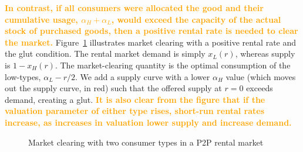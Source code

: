 \documentclass[11pt]{article}
\newcommand{\important}[1]{\textcolor{orange}{\textbf{#1}}}
\begin{document}
\important{In contrast, if all consumers were allocated the good and their cumulative usage, $\alpha_H + \alpha_L$, would exceed the capacity of the actual stock of purchased goods, then a positive rental rate is needed to clear the market.}
Figure~\ref{fig:market_clearing} illustrates market clearing with a positive rental rate and the glut condition. 
The rental market demand is simply $x_L(r)$, whereas supply is $1-x_H(r)$. 
The market-clearing quantity is the optimal consumption of the low-types, $\alpha_L - r/2$. 
We add a supply curve with a lower $\alpha_H$ value (which moves out the supply curve, in red) such that the offered supply at $r = 0$ exceeds demand, creating a glut.  
\important{It is also clear from the figure that if the valuation parameter of either type rises, short-run rental rates increase, as increases in valuation lower supply and increase demand.} 
 
\newcommand*{\alphaH}{0.90}%
\newcommand*{\alphaL}{0.50}%
\newcommand*{\alphaHp}{0.40}
\pgfmathsetmacro{\r}{-1 + \alphaH + \alphaL}%
\pgfmathsetmacro{\Q}{\alphaL - \r/2}
\begin{figure} 
\caption{Market clearing with two consumer types in a P2P rental market} 
\label{fig:market_clearing} 
\begin{center}
\end{center}
\end{figure} 
\end{document}
